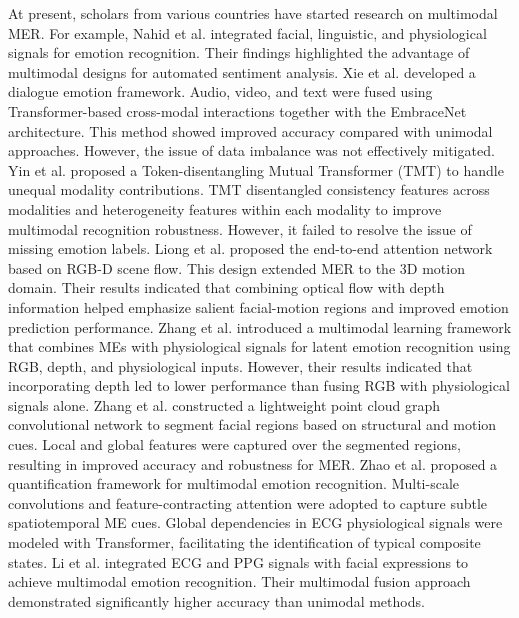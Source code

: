 \documentclass[lettersize,journal]{IEEEtran}
\begin{document}
At present, scholars from various countries have started research on multimodal MER. For example, Nahid et al.\cite{25} integrated facial, linguistic, and physiological signals for emotion recognition. Their findings highlighted the advantage of multimodal designs for automated sentiment analysis. Xie et al. \cite{26} developed a dialogue emotion framework. Audio, video, and text were fused using Transformer-based cross-modal interactions together with the EmbraceNet architecture. This method showed improved accuracy compared with unimodal approaches. However, the issue of data imbalance was not effectively mitigated. Yin et al.\cite{27} proposed a Token-disentangling Mutual Transformer (TMT) to handle unequal modality contributions. TMT disentangled consistency features across modalities and heterogeneity features within each modality to improve multimodal recognition robustness. However, it failed to resolve the issue of missing emotion labels. Liong et al.\cite{28} proposed the end-to-end attention network based on RGB-D scene flow. This design extended MER to the 3D motion domain. Their results indicated that combining optical flow with depth information helped emphasize salient facial-motion regions and improved emotion prediction performance. Zhang et al.\cite{7} introduced a multimodal learning framework that combines MEs with physiological signals for latent emotion recognition using RGB, depth, and physiological inputs. However, their results indicated that incorporating depth led to lower performance than fusing RGB with physiological signals alone. Zhang et al.\cite{3} constructed a lightweight point cloud graph convolutional network to segment facial regions based on structural and motion cues. Local and global features were captured over the segmented regions, resulting in improved accuracy and robustness for MER. Zhao et al.\cite{29} proposed a quantification framework for multimodal emotion recognition. Multi-scale convolutions and feature-contracting attention were adopted to capture subtle spatiotemporal ME cues. Global dependencies in ECG physiological signals were modeled with Transformer, facilitating the identification of typical composite states. Li et al.\cite{30} integrated ECG and PPG signals with facial expressions to achieve multimodal emotion recognition. Their multimodal fusion approach demonstrated significantly higher accuracy than unimodal methods.
\end{document}
